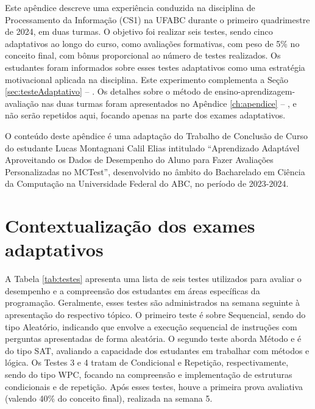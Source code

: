 \label{ch:apendiceB}

Este apêndice descreve uma experiência conduzida na disciplina de Processamento da Informação (CS1) na UFABC durante o primeiro quadrimestre de 2024, em duas turmas. O objetivo foi realizar seis testes, sendo cinco adaptativos ao longo do curso, como avaliações formativas, com peso de 5\% no conceito final, com bônus proporcional ao número de testes realizados. Os estudantes foram informados sobre esses testes adaptativos como uma estratégia motivacional aplicada na disciplina. Este experimento complementa a Seção \ref{sec:testeAdaptativo} -- . Os detalhes sobre o método de ensino-aprendizagem-avaliação nas duas turmas foram apresentados no Apêndice \ref{ch:apendice} -- , e não serão repetidos aqui, focando apenas na parte dos exames adaptativos.

O conteúdo deste apêndice é uma adaptação do Trabalho de Conclusão de Curso do estudante Lucas Montagnani Calil Elias intitulado ``Aprendizado Adaptável Aproveitando os Dados de Desempenho do Aluno para Fazer Avaliações Personalizadas no MCTest'', desenvolvido no âmbito do Bacharelado em Ciência da Computação na Universidade Federal do ABC, no período de 2023-2024.

\section{Contextualização dos exames adaptativos}


A Tabela \ref{tab:testes} apresenta uma lista de seis testes utilizados para avaliar o desempenho e a compreensão dos estudantes em áreas específicas da programação. Geralmente, esses testes são administrados na semana seguinte à apresentação do respectivo tópico. O primeiro teste é sobre Sequencial, sendo do tipo Aleatório, indicando que envolve a execução sequencial de instruções com perguntas apresentadas de forma aleatória. O segundo teste aborda Método e é do tipo SAT, avaliando a capacidade dos estudantes em trabalhar com métodos e lógica. Os Testes 3 e 4 tratam de Condicional e Repetição, respectivamente, sendo do tipo WPC, focando na compreensão e implementação de estruturas condicionais e de repetição. Após esses testes, houve a primeira prova avaliativa (valendo 40\% do conceito final), realizada na semana 5. 

